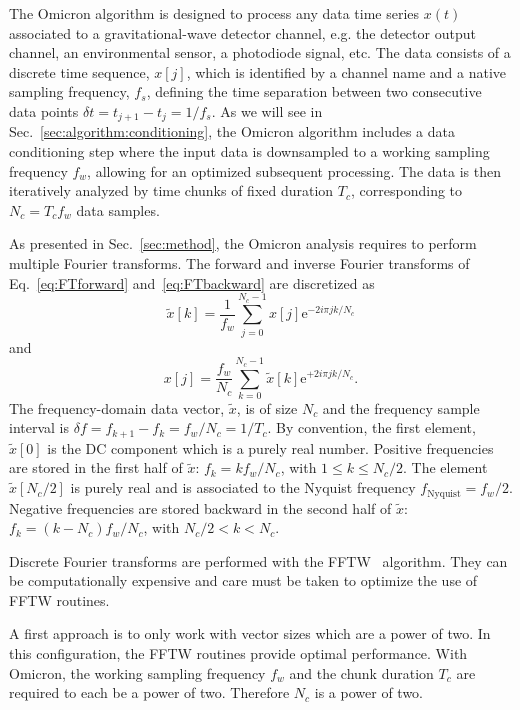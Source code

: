The Omicron algorithm is designed to process any data time series $x(t)$ associated to a gravitational-wave detector channel, e.g. the detector output channel, an environmental sensor, a photodiode signal, etc. The data consists of a discrete time sequence, $x[j]$, which is identified by a channel name and a native sampling frequency, $f_s$, defining the time separation between two consecutive data points $\delta t = t_{j+1}-t_j = 1/f_s$. As we will see in Sec.~\ref{sec:algorithm:conditioning}, the Omicron algorithm includes a data conditioning step where the input data is downsampled to a working sampling frequency $f_w$, allowing for an optimized subsequent processing. The data is then iteratively analyzed by time chunks of fixed duration $T_c$, corresponding to $N_c=T_cf_w$ data samples.

As presented in Sec.~\ref{sec:method}, the Omicron analysis requires to perform multiple Fourier transforms. The forward and inverse Fourier transforms of Eq.~\ref{eq:FTforward} and~\ref{eq:FTbackward} are discretized as 
\begin{equation}
  \tilde{x}[k]=\frac{1}{f_w}\sum_{j=0}^{N_c-1}{x[j]\mathrm{e}^{-2i\pi jk/N_c}}
  \label{eq:dFTforward}
\end{equation}
and
\begin{equation}
  x[j]=\frac{f_w}{N_c}\sum_{k=0}^{N_c-1}{\tilde{x}[k]\mathrm{e}^{+2i\pi jk/N_c}}.
  \label{eq:dFTbackward}
\end{equation}
The frequency-domain data vector, $\tilde{x}$, is of size $N_c$ and the frequency sample interval is $\delta f = f_{k+1}-f_k = f_w/N_c = 1/T_c$. By convention, the first element, $\tilde{x}[0]$ is the DC component which is a purely real number. Positive frequencies are stored in the first half of $\tilde{x}$: $f_k=kf_w/N_c$, with $1\le k \le N_c/2$. The element $\tilde{x}[N_c/2]$ is purely real and is associated to the Nyquist frequency $f_{\text{Nyquist}}=f_w/2$. Negative frequencies are stored backward in the second half of $\tilde{x}$: $f_k=(k-N_c)f_w/N_c$, with $N_c/2 < k < N_c$.

Discrete Fourier transforms are performed with the FFTW~\cite{FFTW} algorithm. They can be computationally expensive and care must be taken to optimize the use of FFTW routines.

A first approach is to only work with vector sizes which are a power of two. In this configuration, the FFTW routines provide optimal performance. With Omicron, the working sampling frequency $f_w$ and the chunk duration $T_c$ are required to each be a power of two. Therefore $N_c$ is a power of two.

